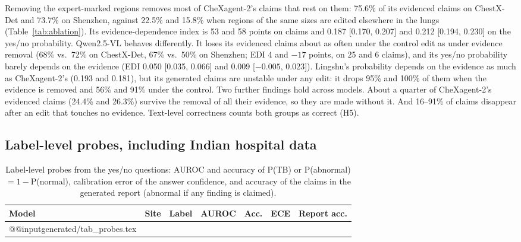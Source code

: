 \documentclass[pdflatex,sn-mathphys-num]{sn-jnl}
\theoremstyle{thmstyleone}
\begin{document}
Removing the expert-marked regions removes most of CheXagent-2's claims that rest on them: 75.6\% of its evidenced claims on ChestX-Det and 73.7\% on Shenzhen, against 22.5\% and 15.8\% when regions of the same sizes are edited elsewhere in the lungs (Table~\ref{tab:ablation}). Its evidence-dependence index is 53 and 58 points on claims and 0.187 [0.170, 0.207] and 0.212 [0.194, 0.230] on the yes/no probability. Qwen2.5-VL behaves differently. It loses its evidenced claims about as often under the control edit as under evidence removal (68\% vs.\ 72\% on ChestX-Det, 67\% vs.\ 50\% on Shenzhen; EDI 4 and $-17$ points, on 25 and 6 claims), and its yes/no probability barely depends on the evidence (EDI 0.050 [0.035, 0.066] and 0.009 [$-0.005$, 0.023]). Lingshu's probability depends on the evidence as much as CheXagent-2's (0.193 and 0.181), but its generated claims are unstable under any edit: it drops 95\% and 100\% of them when the evidence is removed and 56\% and 91\% under the control. Two further findings hold across models. About a quarter of CheXagent-2's evidenced claims (24.4\% and 26.3\%) survive the removal of all their evidence, so they are made without it. And 16--91\% of claims disappear after an edit that touches no evidence. Text-level correctness counts both groups as correct (H5).

\subsection{Label-level probes, including Indian hospital data}

\begin{table}[t]
\caption{Label-level probes from the yes/no questions: AUROC and accuracy of P(TB) or P(abnormal) $=1-$P(normal), calibration error of the answer confidence, and accuracy of the claims in the generated report (abnormal if any finding is claimed).}\label{tab:probes}
\centering
\scriptsize
\setlength{\tabcolsep}{3pt}
\begin{tabular}{@{}lllcccc@{}}
\toprule
Model & Site & Label & AUROC & Acc. & ECE & Report acc. \\
\midrule
\csname @@input\endcsname generated/tab_probes.tex 
\botrule
\end{tabular}
\end{table}
\end{document}
